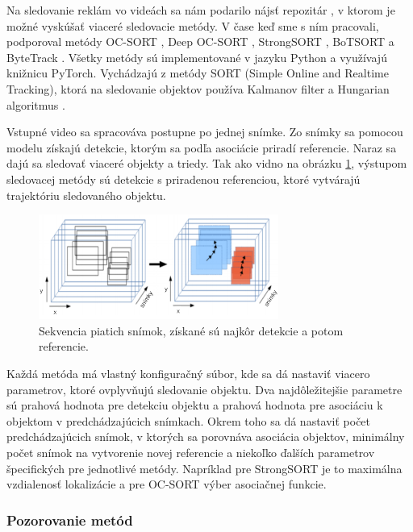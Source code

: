 
Na sledovanie reklám vo videách sa nám podarilo nájsť repozitár \cite{mikel}, v ktorom je možné vyskúšať viaceré sledovacie metódy. V čase keď sme s ním pracovali, podporoval metódy OC-SORT \cite{ocsort}, Deep OC-SORT \cite{deepocsort}, StrongSORT \cite{strongsort}, BoTSORT \cite{bot} a ByteTrack \cite{bytetrack}. Všetky metódy sú implementované v jazyku Python a využívajú knižnicu PyTorch. Vychádzajú z metódy SORT (Simple Online and Realtime Tracking), ktorá na sledovanie objektov používa Kalmanov filter a Hungarian algoritmus \cite{sort}.

Vstupné video sa spracováva postupne po jednej snímke. Zo snímky sa pomocou modelu získajú detekcie, ktorým sa podľa asociácie priradí referencie. Naraz sa dajú sa sledovať viaceré objekty a triedy. Tak ako vidno na obrázku \ref{img:tracking}, výstupom sledovacej metódy sú detekcie s priradenou referenciou, ktoré vytvárajú trajektóriu sledovaného objektu.

 \begin{figure}[ht]
     \centering
     \includegraphics[width=0.7\textwidth]{images/04/tracking.png}
     \caption{Sekvencia piatich snímok, získané sú najkôr detekcie a potom referencie.}
     \label{img:tracking}
 \end{figure}

Každá metóda má vlastný konfiguračný súbor, kde sa dá nastaviť viacero parametrov, ktoré ovplyvňujú sledovanie objektu. Dva najdôležitejšie parametre sú prahová hodnota pre detekciu objektu a prahová hodnota pre asociáciu k objektom v predchádzajúcich snímkach. Okrem toho sa dá nastaviť počet predchádzajúcich snímok, v ktorých sa porovnáva asociácia objektov, minimálny počet snímok na vytvorenie novej referencie a niekoľko ďalších parametrov špecifických pre jednotlivé metódy. Napríklad pre StrongSORT je to maximálna vzdialenosť lokalizácie a pre OC-SORT výber asociačnej funkcie.

\subsubsection{Pozorovanie metód}

